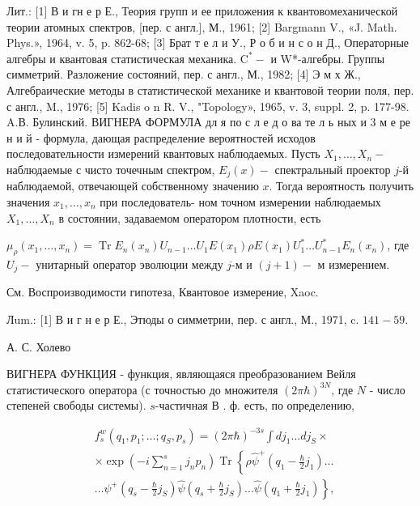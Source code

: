 \documentclass[10pt]{article}
\begin{document}
Лит.: [1] В и гн е р Е., Теория групп и ее приложения к квантовомеханической теории атомных спектров, [пер. с англ.], М., 1961; [2] Bargmann V., «J. Math. Phys.», 1964, v. 5, p. 862-68; [3] Брат т е л и У., Р о б и н с о н Д., Операторные алгебры и квантовая статистическая механика. $\mathrm{C}^{*}-$ и W*-алгебры. Группы симметрий. Разложение состояний, пер. с англ., М., 1982; [4] Э м х Ж., Алгебраические методы в статистической механике и квантовой теории поля, пер. с англ., M., 1976; [5] Kadis o n R. V., "Topology», 1965, v. 3, suppl. 2, p. 177-98. A.В. Булинский. ВИГНЕРА ФОРМУЛА дл я по с л е д о ва те л ь ных и 3 м е ре н и й - формула, дающая распределение вероятностей исходов последовательности измерений квантовых наблюдаемых. Пусть $X_{1}, \ldots, X_{n}-$ наблюдаемые с чисто точечным спектром, $E_{j}(x)-$ спектральный проектор $j$-й наблюдаемой, отвечающей собственному значению $x$. Тогда вероятность получить значения $x_{1}, \ldots, x_{n}$ при последователь- ном точном измерении наблюдаемых $X_{1}, \ldots, X_{n}$ в состоянии, задаваемом оператором плотности, есть



$\mu_{\rho}\left(x_{1}, \ldots, x_{n}\right)=\operatorname{Tr} E_{n}\left(x_{n}\right) U_{n-1} \ldots U_{1} E\left(x_{1}\right) \rho E\left(x_{1}\right) U_{1}^{*} \ldots U_{n-1}^{*} E_{n}\left(x_{n}\right)$, где $U_{j}-$ унитарный оператор эволюции между $j$-м и $(j+1)-$ м измерением.



См. Воспроизводимости гипотеза, Квантовое измерение, Xaoc.



Лum.: [1] В и г н е р Е., Этюды о симметрии, пер. с англ., М., 1971, c. $141-59$.



А. С. Холево



ВИГНЕРА ФУНКЦИЯ - функция, являющаяся преобразованием Вейля статистического оператора (с точностью до множителя $(2 \pi \hbar)^{3 N}$, где $N$ - число степеней свободы системы). $s$-частичная В . ф. есть, по определению,



\[

\begin{aligned}

& f_{s}^{w}\left(q_{1}, p_{1} ; \ldots ; q_{S}, p_{s}\right)=(2 \pi \hbar)^{-3 s} \int d j_{1} \ldots d j_{S} \times \\

& \times \exp \left(-i \sum_{n=1}^{s} j_{n} p_{n}\right) \operatorname{Tr}\left\{\hat{\rho} \hat{\psi}^{+}\left(q_{1}-\frac{\hbar}{2} j_{1}\right) \ldots\right. \\

& \left.\ldots \psi^{+}\left(q_{s}-\frac{\hbar}{2} j_{S}\right) \hat{\psi}\left(q_{s}+\frac{\hbar}{2} j_{S}\right) \ldots \hat{\psi}\left(q_{1}+\frac{\hbar}{2} j_{1}\right)\right\},

\end{aligned}

\]
\end{document}
